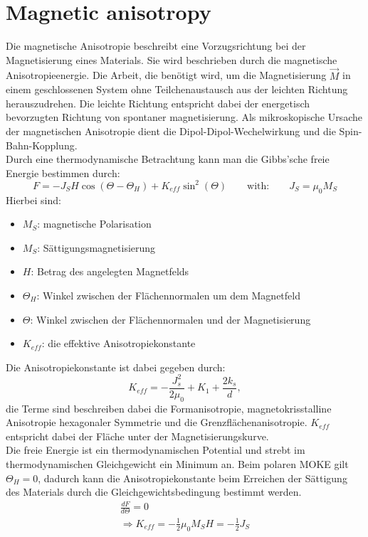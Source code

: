 \section{Magnetic anisotropy}
Die magnetische Anisotropie beschreibt eine Vorzugsrichtung bei der Magnetisierung eines Materials. Sie wird beschrieben durch die magnetische Anisotropieenergie. Die Arbeit, die benötigt wird, um die Magnetisierung $\Vec{M}$ in einem geschlossenen System ohne Teilchenaustausch aus der leichten Richtung herauszudrehen. Die leichte Richtung entspricht dabei der energetisch bevorzugten Richtung von spontaner magnetisierung. Als mikroskopische Ursache der magnetischen Anisotropie dient die Dipol-Dipol-Wechelwirkung und die Spin-Bahn-Kopplung. \\
Durch eine thermodynamische Betrachtung kann man die Gibbs'sche freie Energie bestimmen durch:
\begin{equation}
    F = -J_SH\cos(\Theta-\Theta_H) + K_{eff} \sin^2(\Theta) \qquad \text{with:} \qquad J_S = \mu_0M_S
\end{equation}
Hierbei sind:
\begin{itemize}
    \item $M_S$: magnetische Polarisation
    \item $M_S$: Sättigungsmagnetisierung
    \item $H$: Betrag des angelegten Magnetfelds
    \item $\Theta_H$: Winkel zwischen der Flächennormalen um dem Magnetfeld
    \item $\Theta$: Winkel zwischen der Flächennormalen und der Magnetisierung
    \item $K_{eff}$: die effektive Anisotropiekonstante
\end{itemize}
Die Anisotropiekonstante ist dabei gegeben durch:
\begin{equation}
    K_{eff} = -\frac{J_s^2}{2\mu_0}+K_1+\frac{2k_s}{d},
\end{equation}
die Terme sind beschreiben dabei die Formanisotropie, magnetokrisstalline Anisotropie hexagonaler Symmetrie und die Grenzflächenanisotropie. $K_{eff}$ entspricht dabei der Fläche unter der Magnetisierungskurve. \\
Die freie Energie ist ein thermodynamischen Potential und strebt im thermodynamischen Gleichgewicht ein Minimum an. Beim polaren MOKE gilt $\Theta_H = 0$, dadurch kann die Anisotropiekonstante beim Erreichen der Sättigung des Materials durch die Gleichgewichtsbedingung bestimmt werden.
\begin{align}
    \frac{dF}{d\Theta} = 0 \\
    \Rightarrow K_{eff} = -\frac{1}{2}\mu_0M_SH = -\frac{1}{2}J_S
\end{align}

